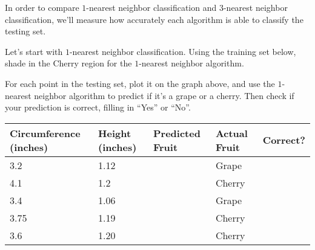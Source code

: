 \documentclass[10pt]{article}
\begin{document}
In order to compare $1$-nearest neighbor classification and $3$-nearest neighbor classification, we'll measure how accurately each algorithm is able to classify the testing set.

Let's start with $1$-nearest neighbor classification. Using the training set below, shade in the Cherry region for the $1$-nearest neighbor algorithm.

\begin{center}
\end{center}

For each point in the testing set, plot it on the graph above, and use the $1$-nearest neighbor algorithm to predict if it's a grape or a cherry. Then check if your prediction is correct, filling in ``Yes'' or ``No''.

\begin{center}
\begin{tabular}{|p{3.5cm}|p{3cm}|p{2.5cm}|p{2cm}|p{2cm}|}
\hline
Circumference (inches) & Height (inches) & Predicted Fruit & Actual Fruit & Correct?\\
\hline
 3.2 & 1.12 & \phantom{\large A} & Grape &\\\hline
 4.1 & 1.2 &\phantom{\large A} & Cherry & \\\hline
 3.4 & 1.06 & \phantom{\large A} & Grape & \\\hline
 3.75 & 1.19 & \phantom{\large A} & Cherry & \\\hline
 3.6 & 1.20 & \phantom{\large A} & Cherry & \\\hline
\end{tabular}
\end{center}
\end{document}

